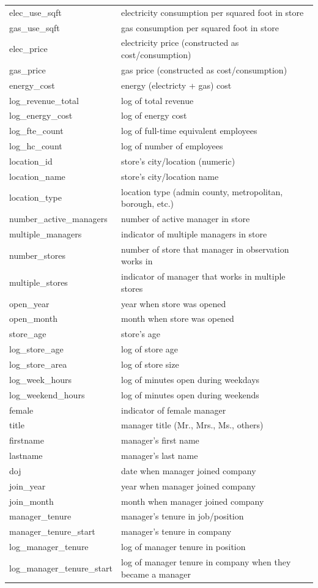 \documentclass[
]{article}
\begin{document}
\begin{longtable}{ll}
elec\_use\_sqft & electricity consumption per squared foot in store \\
gas\_use\_sqft & gas consumption per squared foot in store \\
elec\_price & electricity price (constructed as cost/consumption) \\
gas\_price & gas price (constructed as cost/consumption) \\
energy\_cost & energy (electricty + gas) cost \\
log\_revenue\_total & log of total revenue \\
log\_energy\_cost & log of energy cost \\
log\_fte\_count & log of full-time equivalent employees \\
log\_hc\_count & log of number of employees \\
location\_id & store's city/location (numeric) \\
location\_name & store's city/location name \\
location\_type & location type (admin county, metropolitan, borough, etc.) \\
number\_active\_managers & number of active manager in store \\
multiple\_managers & indicator of multiple managers in store \\
number\_stores & number of store that manager in observation works in \\
multiple\_stores & indicator of manager that works in multiple stores \\
open\_year & year when store was opened \\
open\_month & month when store was opened \\
store\_age & store's age \\
log\_store\_age & log of store age \\
log\_store\_area & log of store size \\
log\_week\_hours & log of minutes open during weekdays \\
log\_weekend\_hours & log of minutes open during weekends \\
female & indicator of female manager \\
title & manager title (Mr., Mrs., Ms., others) \\
firstname & manager's first name \\
lastname & manager's last name \\
doj & date when manager joined company \\
join\_year & year when manager joined company \\
join\_month & month when manager joined company \\
manager\_tenure & manager's tenure in job/position \\
manager\_tenure\_start & manager's tenure in company \\
log\_manager\_tenure & log of manager tenure in position \\
log\_manager\_tenure\_start & log of manager tenure in company when they became a manager \\ \bottomrule
\end{longtable}
\end{document}
